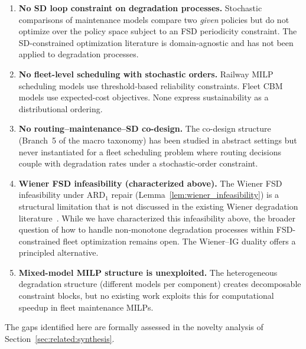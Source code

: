 \documentclass[11pt,a4paper]{article}
\theoremstyle{plain}
\theoremstyle{definition}
\theoremstyle{remark}
\begin{document}
\begin{enumerate}[leftmargin=2em]
  \item \textbf{No SD loop constraint on degradation processes.}
    Stochastic comparisons of maintenance models \cite{mercier2019,mercier2013,castro2016,corset2024}
    compare two \emph{given} policies but do not optimize over the policy space subject
    to an FSD periodicity constraint. The SD-constrained optimization literature
    \cite{dentcheva2003,dentcheva2006} is domain-agnostic and has not been applied to
    degradation processes.

  \item \textbf{No fleet-level scheduling with stochastic orders.}
    Railway MILP scheduling models \cite{railcarMILP2025,dariano2017,compare2020}
    use threshold-based reliability constraints. Fleet CBM
    models \cite{wang2022cbm,xu2021,robustCBM2023} use expected-cost objectives.
    None express sustainability as a distributional ordering.

  \item \textbf{No routing--maintenance--SD co-design.}
    The co-design structure (Branch~5 of the macro taxonomy) has been studied
    in abstract settings \cite{censi2015,topkis1998} but never instantiated for a
    fleet scheduling problem where routing decisions couple with degradation rates
    under a stochastic-order constraint.

  \item \textbf{Wiener FSD infeasibility (characterized above).}
    The Wiener FSD infeasibility under ARD$_1$ repair
    (Lemma~\ref{lem:wiener_infeasibility}) is a structural limitation that
    is not discussed in the existing Wiener degradation
    literature~\cite{whitmore1995,si2013,guan2020}.
    While we have characterized this infeasibility above, the broader question
    of how to handle non-monotone degradation processes within FSD-constrained
    fleet optimization remains open.
    The Wiener--IG duality \cite{tweedie1957,wang2010}
    offers a principled alternative.

  \item \textbf{Mixed-model MILP structure is unexploited.}
    The heterogeneous degradation structure (different models per component)
    creates decomposable constraint blocks, but no existing work exploits this
    for computational speedup in fleet maintenance MILPs.
\end{enumerate}

The gaps identified here are formally assessed in the novelty analysis of
Section~\ref{sec:related:synthesis}.
\end{document}
